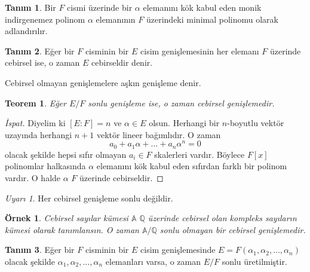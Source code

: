 \documentclass{article}
\newtheorem{thm}{Teorem}[section]
\newtheorem{exmp}{Örnek}
\theoremstyle{definition}
\newtheorem{defn}{Tanım}[section]
\theoremstyle{remark}
\newtheorem{rem}{Uyarı}[section]
\begin{document}
            \begin{defn}
                Bir $F$ cismi üzerinde bir $\alpha$ elemanını kök kabul eden monik indirgenemez polinom $\alpha$ elemanının $F$ üzerindeki minimal polinomu olarak adlandırılır.
            \end{defn}
            
            \begin{defn}
                Eğer bir $F$ cisminin bir $E$ cisim genişlemesinin her elemanı $F$ üzerinde cebirsel ise, o zaman $E$ cebirseldir denir.\par
                Cebirsel olmayan genişlemelere aşkın genişleme denir.
            \end{defn}
            
            \begin{thm}
                Eğer $E/F$ sonlu genişleme ise, o zaman cebirsel genişlemedir.
            \end{thm}
            
            \begin{proof}[İspat]
                Diyelim ki $[E:F] = n$ ve $\alpha \in E$ olsun. Herhangi bir $n$-boyutlu vektör uzayında herhangi $n + 1$ vektör lineer bağımlıdır.
                O zaman
                \begin{equation*}
                    a_0 + a_1\alpha + \dots + a_n\alpha^n = 0
                \end{equation*}
                olacak şekilde hepsi sıfır olmayan $a_i \in F$ skalerleri vardır. Böylece $F[x]$ polinomlar halkasında $\alpha$ elemanını kök kabul eden sıfırdan farklı bir polinom vardır. O halde $\alpha$ $F$ üzerinde cebirseldir.
            \end{proof}
            
            \begin{rem}
                Her cebirsel genişleme sonlu değildir.
            \end{rem}
            
            \begin{exmp}
                Cebirsel sayılar kümesi $\mathbb{A}$ $\mathbb{Q}$ üzerinde cebirsel olan kompleks sayıların kümesi olarak tanımlansın. O zaman $\mathbb{A}/\mathbb{Q}$ sonlu olmayan bir cebirsel genişlemedir.
                
            \end{exmp}
            
            \begin{defn}
                Eğer bir $F$ cisminin bir $E$ cisim genişlemesinde $E = F(\alpha_1, \alpha_2, \dots, \alpha_n)$ olacak şekilde $\alpha_1, \alpha_2, \dots, \alpha_n$ elemanları varsa, o zaman $E/F$ sonlu üretilmiştir.
            \end{defn}
            
\end{document}
